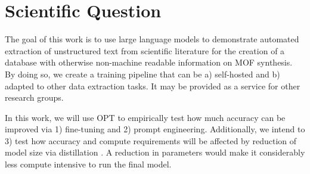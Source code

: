 \chapter{Scientific Question}
The goal of this work is to use large language models to demonstrate automated
extraction of unstructured text from scientific literature for the creation of
a database with otherwise non-machine readable information on MOF synthesis. By
doing so, we create a training pipeline that can be a) self-hosted and b)
adapted to other data extraction tasks. It may be provided as a service for
other research groups.

In this work, we will use OPT \cite{zhang_opt_2022} to empirically test how
much accuracy can be improved via 1) fine-tuning and 2) prompt engineering.
Additionally, we intend to 3) test how accuracy and compute requirements will be
affected by reduction of model size via distillation \cite{sun_patient_2019}.
A reduction in parameters would make it considerably less compute intensive to
run the final model.


